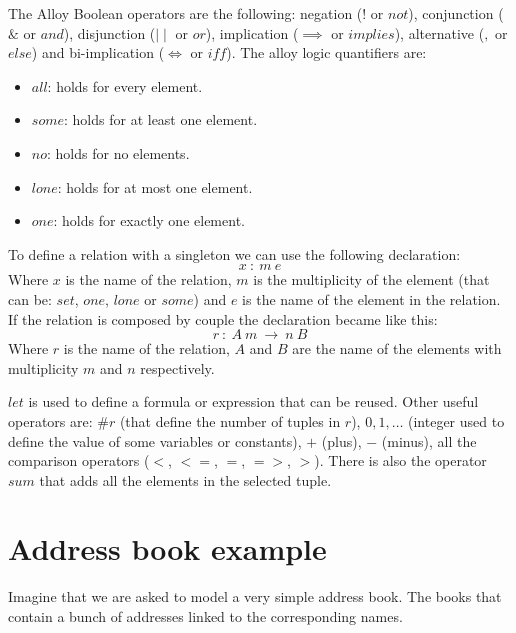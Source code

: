 \documentclass[12pt, a4paper]{report}
\newtheorem[style=M,bodystyle=\normalfont]{theorem}{Theorem}
\newtheorem[style=M,bodystyle=\normalfont]{corollary}{Corollary}
\newtheorem[style=M,bodystyle=\normalfont]{lemma}{Lemma}
\newtheorem[style=M,bodystyle=\normalfont]{definition}{Definition}
\begin{document}
        The Alloy Boolean operators are the following: negation ($!$ or $not$), conjunction ($\&$ or $and$), disjunction ($\mid \mid$ or $or$), implication ($\implies$ or $implies$), alternative ($,$ or $else$) and bi-implication ($\iff$ or $iff$). The alloy logic quantifiers are: 
        \begin{itemize}
            \item $all$: holds for every element.
            \item $some$: holds for at least one element.
            \item $no$: holds for no elements.
            \item $lone$: holds for at most one element.
            \item $one$: holds for exactly one element.
        \end{itemize}
        To define a relation with a singleton we can use the following declaration: 
        \[x \: : \: m \: e\]
        Where $x$ is the name of the relation, $m$ is the multiplicity of the element (that can be: $set$, $one$, $lone$ or $some$) and $e$ is the name of the element in the relation. If the relation is composed by couple the declaration became like this: 
        \[r \: : \: A \: m \: \rightarrow \: n \: B\]
        Where $r$ is the name of the relation, $A$ and $B$ are the name of the elements with multiplicity $m$ and $n$ respectively.
         
        $let$ is used to define a formula or expression that can be reused. Other useful operators are: $\# r$ (that define the number of tuples in $r$), $0,1,\dots$ (integer used to define the value of some variables or constants), $+$ (plus), $-$ (minus), all the comparison operators ($<$, $<=$, $=$, $=>$, $>$). There is also the operator $sum$ that adds all the elements in the selected tuple. 

        \section{Address book example}
        Imagine that we are asked to model a very simple address book. The books that contain a bunch of addresses linked to the corresponding names. 
        
\end{document}
